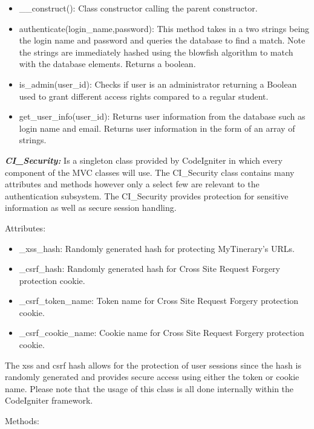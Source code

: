 \begin{itemize}
\item
  \_\_construct(): Class constructor calling the parent constructor.
\item
  authenticate(login\_name,password): This method takes in a two strings
  being the login name and password and queries the database to find a
  match. Note the strings are immediately hashed using the blowfish
  algorithm to match with the database elements. Returns a boolean.
\item
  is\_admin(user\_id): Checks if user is an administrator returning a
  Boolean used to grant different access rights compared to a regular
  student.
\item
  get\_user\_info(user\_id): Returns user information from the database
  such as login name and email. Returns user information in the form of
  an array of strings.
\end{itemize}

\textbf{\emph{CI\_Security:}} Is a singleton class provided by
CodeIgniter in which every component of the MVC classes will use. The
CI\_Security class contains many attributes and methods however only a
select few are relevant to the authentication subsystem. The
CI\_Security provides protection for sensitive information as well as
secure session handling.

Attributes:

\begin{itemize}
\item
  \_xss\_hash: Randomly generated hash for protecting MyTinerary's URLs.
\item
  \_csrf\_hash: Randomly generated hash for Cross Site Request Forgery
  protection cookie.
\item
  \_csrf\_token\_name: Token name for Cross Site Request Forgery
  protection cookie.
\item
  \_csrf\_cookie\_name: Cookie name for Cross Site Request Forgery
  protection cookie.
\end{itemize}

The xss and csrf hash allows for the protection of user sessions since
the hash is randomly generated and provides secure access using either
the token or cookie name. Please note that the usage of this class is
all done internally within the CodeIgniter framework.

Methods:

